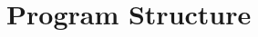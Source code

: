 \documentclass[../main.tex]{subfiles}
\begin{document}
\section{Program Structure}\label{sec:program}
\end{document}
